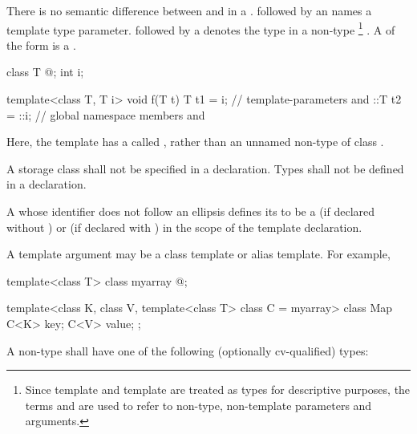 \pnum
There is no semantic difference between
and
in a
.
followed by an
names a template type parameter.
followed by a
denotes the type in a non-type%
\footnote{Since template
and template
are treated as types for descriptive purposes, the terms
and
are used to refer to non-type, non-template parameters and arguments.}
.
A  of the form
  is a .
\begin{example}
\begin{codeblock}
class T { @\commentellip@ };
int i;

template<class T, T i> void f(T t) {
  T t1 = i;         // template-parameters  and 
  ::T t2 = ::i;     // global namespace members  and 
}
\end{codeblock}
Here, the template  has a 
called , rather than an unnamed non-type
 of class .
\end{example}
A storage class shall not be specified in a
declaration.
Types shall not be defined in a 
declaration.

\pnum
A
whose identifier does not follow an ellipsis
defines its
to be a
(if declared without
)
or
(if declared with
)
in the scope of the template declaration.
\begin{note}
A template argument may be a class template or alias template.
For example,

\begin{codeblock}
template<class T> class myarray { @\commentellip@ };

template<class K, class V, template<class T> class C = myarray>
class Map {
  C<K> key;
  C<V> value;
};
\end{codeblock}
\end{note}

\pnum
A non-type 
shall have one of the following (optionally cv-qualified) types:

